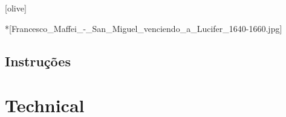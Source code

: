 
\newcommand{\subbooktitle}{Cura}





  
  \imprintpage

  \toc

  \setcounter{chapter}{0}

    \begin{songs}{}
      
    \end{songs}

    \begin{songs}{}
      
    \end{songs}

  [olive]
    \begin{songs}{}
      
    \end{songs}

  *[Francesco_Maffei_-_San_Miguel_venciendo_a_Lucifer_1640-1660.jpg]
    \section{Instruções}
        
      \begin{songs}{}
        
      \end{songs}
      \begin{songs}{}
        
      \end{songs}
      \begin{songs}{}
        
      \end{songs}

  \appendix
  \chapter{Technical}
    


